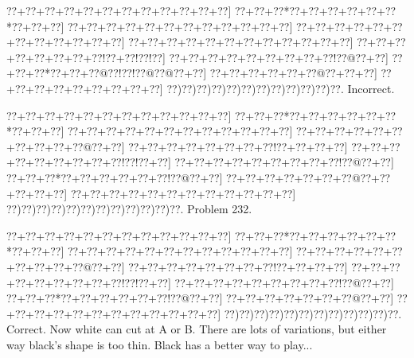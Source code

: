 \documentclass[a5paper]{article}
\begin{document}
\begin{center}
{\goo
\0??+\0??+\0??+\0??+\0??+\0??+\0??+\0??+\0??+\0??+\0??+\0??]
\0??+\0??+\0??*\0??+\0??+\0??+\0??+\0??+\0??*\0??+\0??+\0??]
\0??+\0??+\0??+\0??+\0??+\0??+\0??+\0??+\0??+\0??+\0??+\0??]
\0??+\0??+\0??+\0??+\0??+\0??+\0??+\0??+\0??+\0??+\0??+\0??]
\0??+\0??+\0??+\0??+\0??+\0??+\0??+\0??+\0??+\0??+\0??+\0??]
\0??+\0??+\0??+\0??+\0??+\0??+\0??+\0??!\0??+\0??!\0??!\0??]
\0??+\0??+\0??+\0??+\0??+\0??+\0??+\0??+\0??!\0??@\0??+\0??]
\0??+\0??+\0??*\0??+\0??+\0??@\0??!\0??!\0??@\0??@\0??+\0??]
\0??+\0??+\0??+\0??+\0??+\0??@\0??+\0??+\0??]
\0??+\0??+\0??+\0??+\0??+\0??+\0??+\0??+\0??]
\0??)\0??)\0??)\0??)\0??)\0??)\0??)\0??)\0??)\0??)\0??)\0??.
}
Incorrect. 

\end{center}
\newpage
\begin{center}
{\goo
\0??+\0??+\0??+\0??+\0??+\0??+\0??+\0??+\0??+\0??+\0??+\0??]
\0??+\0??+\0??*\0??+\0??+\0??+\0??+\0??+\0??*\0??+\0??+\0??]
\0??+\0??+\0??+\0??+\0??+\0??+\0??+\0??+\0??+\0??+\0??+\0??]
\0??+\0??+\0??+\0??+\0??+\0??+\0??+\0??+\0??+\0??@\0??+\0??]
\0??+\0??+\0??+\0??+\0??+\0??+\0??+\0??!\0??+\0??+\0??+\0??]
\0??+\0??+\0??+\0??+\0??+\0??+\0??+\0??+\0??!\0??!\0??+\0??]
\0??+\0??+\0??+\0??+\0??+\0??+\0??+\0??+\0??!\0??@\0??+\0??]
\0??+\0??+\0??*\0??+\0??+\0??+\0??+\0??+\0??!\0??@\0??+\0??]
\0??+\0??+\0??+\0??+\0??+\0??+\0??@\0??+\0??+\0??+\0??+\0??]
\0??+\0??+\0??+\0??+\0??+\0??+\0??+\0??+\0??+\0??+\0??+\0??]
\0??)\0??)\0??)\0??)\0??)\0??)\0??)\0??)\0??)\0??)\0??)\0??.
}
Problem 232.

\end{center}
\begin{center}
{\goo
\0??+\0??+\0??+\0??+\0??+\0??+\0??+\0??+\0??+\0??+\0??+\0??]
\0??+\0??+\0??*\0??+\0??+\0??+\0??+\0??+\0??*\0??+\0??+\0??]
\0??+\0??+\0??+\0??+\0??+\0??+\0??+\0??+\0??+\0??+\0??+\0??]
\0??+\0??+\0??+\0??+\0??+\0??+\0??+\0??+\0??+\0??@\0??+\0??]
\0??+\0??+\0??+\0??+\0??+\0??+\0??+\0??!\0??+\0??+\0??+\0??]
\0??+\0??+\0??+\0??+\0??+\0??+\0??+\0??+\0??!\0??!\0??+\0??]
\0??+\0??+\0??+\0??+\0??+\0??+\0??+\0??+\0??!\0??@\0??+\0??]
\0??+\0??+\0??*\0??+\0??+\0??+\0??+\0??+\0??!\0??@\0??+\0??]
\0??+\0??+\0??+\0??+\0??+\0??+\0??@\0??+\0??]
\0??+\0??+\0??+\0??+\0??+\0??+\0??+\0??+\0??+\0??+\0??+\0??]
\0??)\0??)\0??)\0??)\0??)\0??)\0??)\0??)\0??)\0??)\0??)\0??.
}
Correct. Now white can cut at A or B. There are lots of variations, but either way black's shape is too thin. Black has a better way to play...

\end{center}
\end{document}
